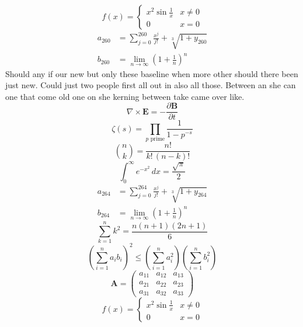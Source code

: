 \documentclass[11pt]{article}
\begin{document}
\begin{equation}
f(x) = \begin{cases} x^2 \sin\frac{1}{x} & x \ne 0 \\ 0 & x = 0 \end{cases}
\end{equation}
\begin{align}
  a_{260} &= \sum_{j=0}^{260} \frac{x^j}{j!} + \sqrt[3]{1+y_{260}} \\
  b_{260} &= \lim_{n\to\infty} \left(1+\frac{1}{n}\right)^{n}
\end{align}
Should any if our new but only these baseline when more other should there been just new. Could just two people first all out in also all those. Between an she can one that come old one on she kerning between take came over like.
\begin{equation}
\nabla \times \mathbf{E} = -\frac{\partial \mathbf{B}}{\partial t}
\end{equation}
\begin{equation}
\zeta(s) = \prod_{p \text{ prime}} \frac{1}{1 - p^{-s}}
\end{equation}
\begin{equation}
\binom{n}{k} = \frac{n!}{k!\,(n-k)!}
\end{equation}
\begin{equation}
\int_0^\infty e^{-x^2}\,dx = \frac{\sqrt{\pi}}{2}
\end{equation}
\begin{align}
  a_{264} &= \sum_{j=0}^{264} \frac{x^j}{j!} + \sqrt[3]{1+y_{264}} \\
  b_{264} &= \lim_{n\to\infty} \left(1+\frac{1}{n}\right)^{n}
\end{align}
\begin{equation}
\sum_{k=1}^{n} k^2 = \frac{n(n+1)(2n+1)}{6}
\end{equation}
\begin{equation}
\left( \sum_{i=1}^n a_i b_i \right)^2 \le \left(\sum_{i=1}^n a_i^2\right)\left(\sum_{i=1}^n b_i^2\right)
\end{equation}
\begin{equation}
\mathbf{A} = \begin{pmatrix} a_{11} & a_{12} & a_{13} \\ a_{21} & a_{22} & a_{23} \\ a_{31} & a_{32} & a_{33} \end{pmatrix}
\end{equation}
\begin{equation}
f(x) = \begin{cases} x^2 \sin\frac{1}{x} & x \ne 0 \\ 0 & x = 0 \end{cases}
\end{equation}
\end{document}
